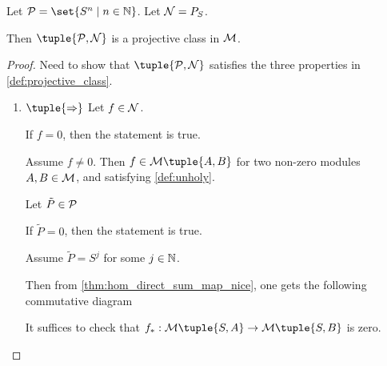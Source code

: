 \begin{example}
    Let \( \Pc = \set{ S^n \mid n \in \Nb } \). Let \( {\mathcal{N}} = P_S \).

    Then \( \tuple{ \Pc, \Nc} \) is a projective class in \( {\mathcal{M}} \).
\end{example}
\begin{proof}
    Need to show that \( \tuple{ \Pc, \Nc } \) satisfies the three properties in \autoref{def:projective_class}.

    \begin{enumerate}
        \item {
            \( \tuple{ \Rightarrow } \) Let \( f \in {\mathcal{N}} \).

            If \( f = 0 \), then the statement is true.

            Assume \( f \neq 0 \). Then \( f \in \Mc\tuple{A, B} \) for two non-zero modules \( A, B \in {\mathcal{M}} \), and satisfying \autoref{def:unholy}.
            
            Let \( \tilde{P} \in {\mathcal{P}} \)
            
            If \( \tilde{P} = 0 \), then the statement is true.

            Assume \( \tilde{P} = S^j \) for some \( j \in {\mathbb{N}} \).

            Then from \autoref{thm:hom_direct_sum_map_nice}, one gets the following commutative diagram
            \begin{center}
            \end{center}
            It suffices to check that \( f_*: \Mc\tuple{S, A} \to \Mc\tuple{S, B} \) is zero.

}
\end{enumerate}
\end{proof}
